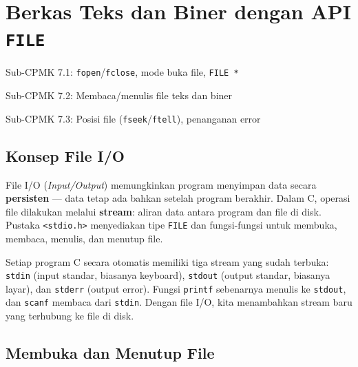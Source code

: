 \documentclass[../main.tex]{subfiles}
\begin{document}
\chapter{Berkas Teks dan Biner dengan API \texttt{FILE}}

\begin{subcpmk}
  \item Sub-CPMK 7.1: \texttt{fopen}/\texttt{fclose}, mode buka file, \texttt{FILE *}
  \item Sub-CPMK 7.2: Membaca/menulis file teks dan biner
  \item Sub-CPMK 7.3: Posisi file (\texttt{fseek}/\texttt{ftell}), penanganan error
\end{subcpmk}


\section{Konsep File I/O}

File I/O (\textit{Input/Output}) memungkinkan program menyimpan data secara \textbf{persisten} --- data tetap ada bahkan setelah program berakhir. Dalam C, operasi file dilakukan melalui \textbf{stream}: aliran data antara program dan file di disk. Pustaka \texttt{<stdio.h>} menyediakan tipe \texttt{FILE} dan fungsi-fungsi untuk membuka, membaca, menulis, dan menutup file.

Setiap program C secara otomatis memiliki tiga stream yang sudah terbuka: \texttt{stdin} (input standar, biasanya keyboard), \texttt{stdout} (output standar, biasanya layar), dan \texttt{stderr} (output error). Fungsi \texttt{printf} sebenarnya menulis ke \texttt{stdout}, dan \texttt{scanf} membaca dari \texttt{stdin}. Dengan file I/O, kita menambahkan stream baru yang terhubung ke file di disk.

\section{Membuka dan Menutup File}
\end{document}
